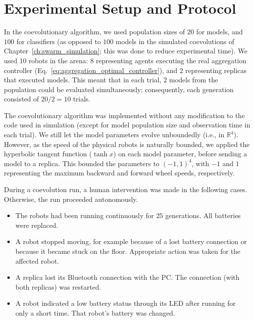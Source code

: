 \section{Experimental Setup and Protocol}\label{sec:experimental_protocol_swarm_physical}
In the coevolutionary algorithm, we used population sizes of $20$ for models, and $100$ for classifiers (as opposed to $100$ models in the simulated coevolutions of Chapter~\ref{ch:swarm_simulation}; this was done to reduce experimental time). We used $10$ robots in the arena: $8$ representing agents executing the real aggregation controller (Eq.~\eqref{eq:aggregation_optimal_controller}), and $2$ representing replicas that executed models. This meant that in each trial, $2$ models from the population could be evaluated simultaneously; consequently, each generation consisted of $20/2=10$ trials. 

The coevolutionary algorithm was implemented without any modification to the code used in simulation (except for model population size and observation time in each trial). We still let the model parameters evolve unboundedly (i.e., in $\mathbb{R}^4$). However, as the speed of the physical robots is naturally bounded, we applied the hyperbolic tangent function ($\tanh{x}$) on each model parameter, before sending a model to a replica. This bounded the parameters to $\left(-1,1\right)^4$, with $-1$ and $1$ representing the maximum backward and forward wheel speeds, respectively.

During a coevolution run, a human intervention was made in the following cases. Otherwise, the run proceeded autonomously.
\begin{itemize}
\item The robots had been running continuously for $25$ generations. All batteries were replaced.

\item A robot stopped moving, for example because of a lost battery connection or because it became stuck on the floor. Appropriate action was taken for the affected robot.

\item A replica lost its Bluetooth connection with the PC. The connection (with both replicas) was restarted.

\item A robot indicated a low battery status through its LED after running for only a short time. That robot's battery was changed.
\end{itemize}

